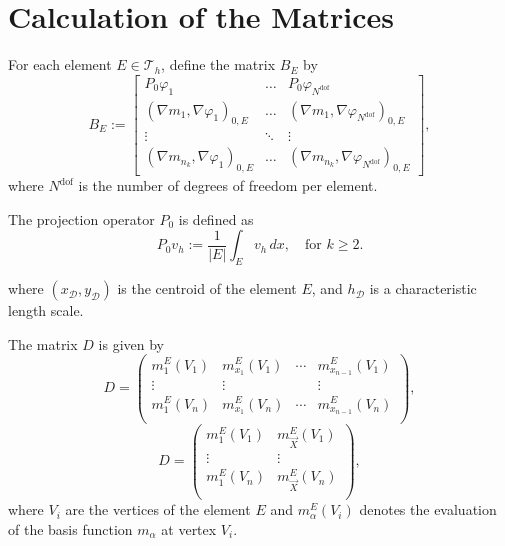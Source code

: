 \documentclass{report}
\begin{document}
\section{Calculation of the Matrices}
For each element $E \in \mathcal{T}_h$, define the matrix $B_E$ by
\[
B_E := \begin{bmatrix}
    P_0 \varphi_1 & \hdots & P_0 \varphi_{N^\text{dof}} \\
    (\nabla m_1, \nabla \varphi_1)_{0,E} & \hdots & (\nabla m_1, \nabla \varphi_{N^\text{dof}})_{0,E} \\
    \vdots & \ddots & \vdots \\
    (\nabla m_{n_k}, \nabla \varphi_1)_{0,E} & \hdots & (\nabla m_{n_k}, \nabla \varphi_{N^\text{dof}})_{0,E}
\end{bmatrix},
\]
where $N^\text{dof}$ is the number of degrees of freedom per element.

The projection operator $P_0$ is defined as
\begin{equation}
    P_0 v_h := \frac{1}{|E|} \int_E v_h \, dx, \quad \text{for } k \geq 2.
\end{equation}

where $(x_{\mathcal{D}}, y_{\mathcal{D}})$ is the centroid of the element $E$, and $h_{\mathcal{D}}$ is a characteristic length scale.

The matrix $D$ is given by
\begin{equation}
    D = \begin{pmatrix}
        m_1^E(V_1) & m_{x_1}^E(V_1) & \cdots& m_{x_{n-1}}^E(V_1) \\
        \vdots & \vdots & & \vdots \\
        m_1^E(V_n) & m_{x_1}^E(V_n) & \cdots & m_{x_{n-1}}^E(V_n) \\
    \end{pmatrix},
\end{equation}
\begin{equation}
    D = \begin{pmatrix}
        m_1^E(V_1) & m_{\vec{X}}^E(V_1) \\
        \vdots &  \vdots \\
        m_1^E(V_n) & m_{\vec{X}}^E(V_n) \\
    \end{pmatrix},
\end{equation}
where $V_i$ are the vertices of the element $E$ and $m_{\alpha}^E(V_i)$ denotes the evaluation of the basis function $m_{\alpha}$ at vertex $V_i$.
\end{document}
